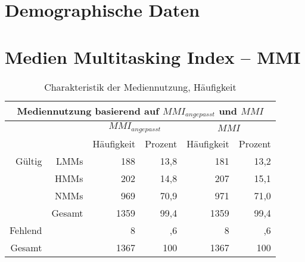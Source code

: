 \begin{RaggedRight}
\section{Demographische Daten}\label{anhangHaeufigkeit.demoDaten}

\section{Medien Multitasking Index -- MMI}\label{anhangHaeufigkeit.mmi}
\begin{table}[H] 
    \centering
    \caption{Charakteristik der Mediennutzung, Häufigkeit}
    \begin{tabular}[t]{|r r|r|r|r|r|} 
        \hline
        \multicolumn{6}{|c|}{\textbf{Mediennutzung basierend auf $MMI_{angepasst}$ und $MMI$}}\\ 
        \hline       
        \multicolumn{2}{|c}{} & \multicolumn{2}{c|}{$MMI_{angepasst}$} & \multicolumn{2}{c|}{$MMI$}\\
        \multicolumn{2}{|c}{} & \multicolumn{1}{c|}{Häufigkeit} & \multicolumn{1}{c|}{Prozent}&\multicolumn{1}{c|}{Häufigkeit} & \multicolumn{1}{c|}{Prozent}\\
        \hline
        Gültig & LMMs & 188 & 13,8 & 181 & 13,2\\
        & HMMs & 202 & 14,8 & 207 & 15,1\\
        & NMMs & 969 & 70,9 & 971 & 71,0\\
        &Gesamt & 1359 & 99,4 & 1359 & 99,4\\
        Fehlend & & 8 & ,6 & 8 & ,6\\
        Gesamt & & 1367 & 100 & 1367 & 100\\
        \hline
    \end{tabular}
    \label{table.deskrptMeediennutzung}
\end{table}


\end{RaggedRight}
